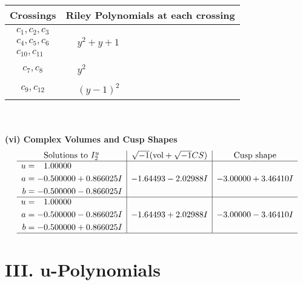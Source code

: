 \documentclass[1p]{elsarticle_modified}
\theoremstyle{definition}
\newcommand{\I}{\sqrt{-1}}
\begin{document}
\begin{tabular}{m{50pt}|m{274pt}}
Crossings & \hspace{64pt}Riley Polynomials at each crossing \\
\hline $$\begin{aligned}c_{1},c_{2},c_{3}\\c_{4},c_{5},c_{6}\\c_{10},c_{11}\end{aligned}$$&$\begin{aligned}
&y^2+y+1
\end{aligned}$\\
\hline $$\begin{aligned}c_{7},c_{8}\end{aligned}$$&$\begin{aligned}
&y^2
\end{aligned}$\\
\hline $$\begin{aligned}c_{9},c_{12}\end{aligned}$$&$\begin{aligned}
&(y-1)^2
\end{aligned}$\\
\hline
\end{tabular}\\~\\
\newpage\flushleft \textbf{(vi) Complex Volumes and Cusp Shapes}
$$\begin{array}{c|c|c}  
\text{Solutions to }I^u_{2}& \I (\text{vol} + \sqrt{-1}CS) & \text{Cusp shape}\\
 \hline 
\begin{aligned}
u &= \phantom{-}1.00000\phantom{ +0.000000I} \\
a &= -0.500000 + 0.866025 I \\
b &= -0.500000 - 0.866025 I\end{aligned}
 & -1.64493 - 2.02988 I & -3.00000 + 3.46410 I \\ \hline\begin{aligned}
u &= \phantom{-}1.00000\phantom{ +0.000000I} \\
a &= -0.500000 - 0.866025 I \\
b &= -0.500000 + 0.866025 I\end{aligned}
 & -1.64493 + 2.02988 I & -3.00000 - 3.46410 I\\
 \hline 
 \end{array}$$\newpage
\newpage\renewcommand{\arraystretch}{1}
\centering \section*{ III. u-Polynomials}
\end{document}
